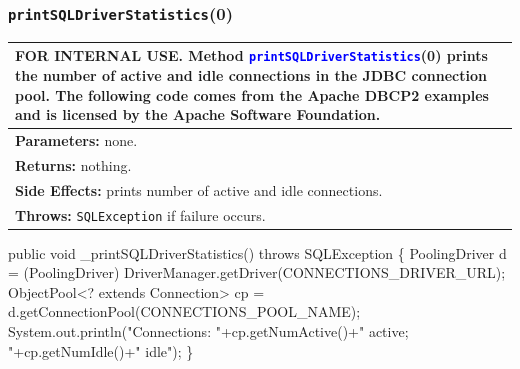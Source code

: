 \documentclass{article}
\def\nwendcode{\endtrivlist \endgroup}      %
\let\nwdocspar=\par
\theoremstyle{definition}                   %
\begin{document}
\subsubsection{{\tt{}{}printSQLDriverStatistics}(0)}
\begin{tabular}{p{\textwidth}}
\toprule
\rowcolor{TableTitle}
FOR INTERNAL USE. Method \textcolor{blue}{{\tt{}{\char95}printSQLDriverStatistics}}(0)
prints the number of active and idle connections in the JDBC connection pool.
The following code comes from the Apache DBCP2 examples and is licensed by the
Apache Software Foundation.\\
\midrule
\textbf{Parameters:} none.\\
\textbf{Returns:} nothing.\\
\textbf{Side Effects:} prints number of active and idle connections.\\
\textbf{Throws:} {\tt{}SQLException} if failure occurs.\\
\bottomrule
\end{tabular}
\nwenddocs{}\endmoddef{}
public void _printSQLDriverStatistics() throws SQLException \{
  PoolingDriver d = (PoolingDriver) DriverManager.getDriver(CONNECTIONS_DRIVER_URL);
  ObjectPool<? extends Connection> cp = d.getConnectionPool(CONNECTIONS_POOL_NAME);
  System.out.println("Connections: "+cp.getNumActive()+" active; "+cp.getNumIdle()+" idle");
\}
\eatline
{}\nwendcode{}\nwdocspar
\end{document}
